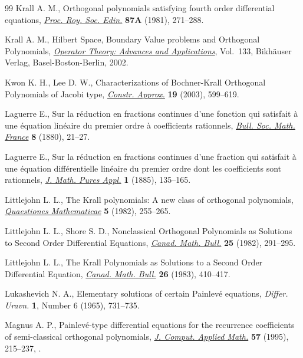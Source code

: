 \documentclass[10pt, reqno]{amsart}
\numberwithin{equation}{section}
\numberwithin{equation}{section}
\begin{document}
\begin{thebibliography}{99}
Krall A. M., 
Orthogonal polynomials satisfying fourth order differential equations, 
\href{https://doi.org// 10.1017/S0308210500015213}{\textit{Proc. Roy. Soc. Edin.}} \textbf{87A} (1981), 271--288.

Krall A. M., 
Hilbert Space, Boundary Value problems and Orthogonal Polynomials, 
\href{https://doi.org//10.1007/978-3-0348-8155-5}{\textit{Operator Theory: Advances and Applications}}, Vol.~133, 
Bikhäuser Verlag, Basel-Boston-Berlin, 2002.

Kwon K. H., Lee D. W., 
Characterizations of Bochner-Krall Orthogonal Polynomials of Jacobi type, 
\href{https://doi.org//10.1007/s00365-003-0540-7}{\textit{Constr. Approx.}} \textbf{19} (2003), 599--619.

Laguerre E., 
Sur la réduction en fractions continues d'une fonction qui satisfait à une équation linéaire du premier ordre à coefficients rationnels,
\href{https://www.numdam.org/item/10.24033/bsmf.179.pdf}{\textit{Bull. Soc. Math. France}} \textbf{8} (1880), 21--27.

Laguerre E., 
Sur la réduction en fractions continues d'une fraction qui satisfait à une équation différentielle linéaire du premier ordre dont les coefficients sont rationnels, 
\href{https://www.numdam.org/item/JMPA_1885_4_1__135_0/}{\textit{J. Math. Pures Appl.}} \textbf{1} (1885), 135--165.

Littlejohn L. L., 
The Krall polynomials: A new class of orthogonal polynomials, 
\href{https://doi.org//10.1080/16073606.1982.9632267}{\textit{Quaestiones Mathematicae}} \textbf{5} (1982), 255--265.

Littlejohn L. L., Shore S. D., 
Nonclassical Orthogonal Polynomials as Solutions to Second Order Differential Equations, 
\href{https://doi.org/10.4153/CMB-1982-040-2}{\textit{Canad. Math. Bull.}} \textbf{25} (1982), 291--295.

Littlejohn L. L., 
The Krall Polynomials as Solutions to a Second Order Differential Equation, 
\href{https://doi.org//10.4153/CMB-1983-068-9}{\textit{Canad. Math. Bull.}} \textbf{26} (1983), 410--417.

Lukashevich N. A., 
Elementary solutions of certain Painlevé equations, 
\textit{Differ. Uravn.} \textbf{1}, Number 6 (1965), 731--735.

Magnus A. P., 
Painlevé-type differential equations for the recurrence coefficients of semi-classical orthogonal polynomials, 
\href{https://doi.org//10.1016/0377-0427(93)E0247-J}{\textit{J. Comput. Applied Math.}} \textbf{57} (1995), 215--237, 
.


\end{thebibliography}
\end{document}
